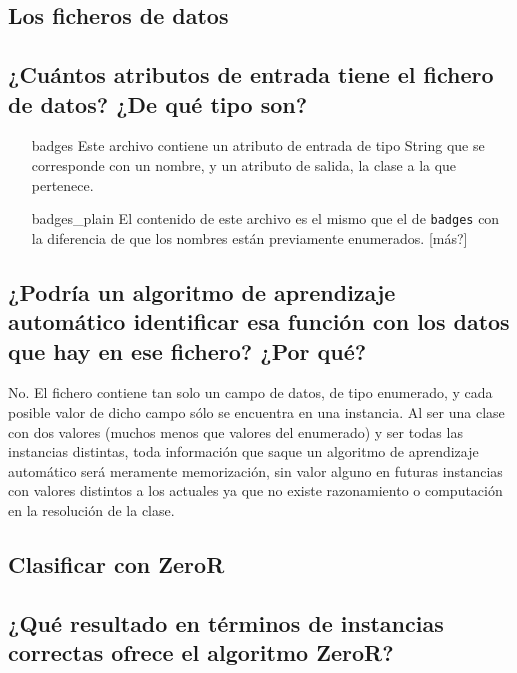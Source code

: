 \documentclass[12pt]{article}
\begin{document}
\tableofcontents

\newpage

\begin{center}
\section{Los ficheros de datos}
\end{center}

\subsection*{\small ¿Cuántos atributos de entrada tiene el fichero de datos?
¿De qué tipo son?}

\begin{itemize}
  \item[badges] Este archivo contiene un atributo de entrada de tipo String que
  se corresponde con un nombre, y un atributo de salida, la clase a la que
  pertenece.
  \item[badges\_plain] El contenido de este archivo es el mismo que el de
  \texttt{badges} con la diferencia de que los nombres están previamente
  enumerados. [más?]
\end{itemize}

\subsection*{\small ¿Podría un algoritmo de aprendizaje automático identificar
esa función con los datos que hay en ese fichero? ¿Por qué?}

No. El fichero contiene tan solo un campo de datos, de tipo enumerado, y cada
posible valor de dicho campo sólo se encuentra en una instancia. Al ser una
clase con dos valores (muchos menos que valores del enumerado) y ser todas las
instancias distintas, toda información que saque un algoritmo de aprendizaje
automático será meramente memorización, sin valor alguno en futuras instancias
con valores distintos a los actuales ya que no existe razonamiento o
computación en la resolución de la clase.

\newpage

\begin{center}
\section{Clasificar con ZeroR}
\end{center}

\subsection*{\small ¿Qué resultado en términos de instancias correctas ofrece el
algoritmo ZeroR?}
\end{document}
